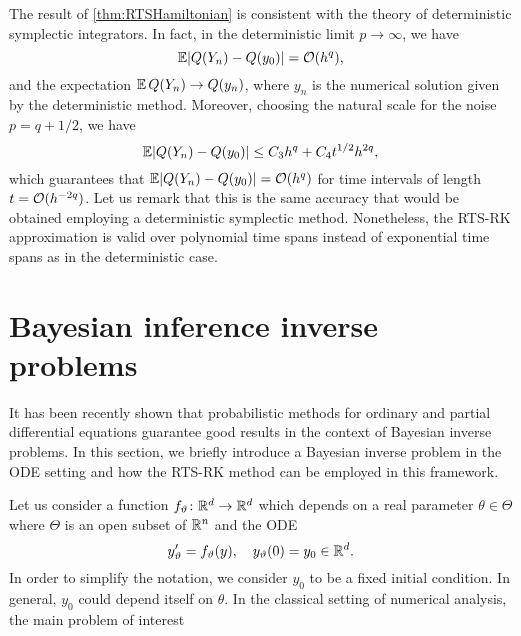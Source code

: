 \documentclass[final,onefignum,onetabnum]{siamonline171218}
\begin{document}
\begin{remark} The result of \cref{thm:RTSHamiltonian} is consistent with the theory of deterministic symplectic integrators. In fact, in the deterministic limit $p \to \infty$, we have
	\begin{equation}
	\operatorname{\mathbb{E}} \lvert Q(Y_n) - Q(y_0)\rvert = \mathcal{O}(h^q),
	\end{equation}
	and the expectation $\operatorname{\mathbb{E}} Q(Y_n) \to Q(y_n)$, where $y_n$ is the numerical solution given by the deterministic method. Moreover, choosing the natural scale for the noise $p = q + 1/2$, we have
	\begin{equation}\label{eq:OptimalNoiseScale}
	\E\abs{Q(Y_n) - Q(y_0)} \leq C_3 h^q + C_4t^{1/2}h^{2q},
	\end{equation} 
	which guarantees that $\operatorname{\mathbb{E}}\lvert Q(Y_n) - Q(y_0)\rvert = \mathcal{O}(h^q)$ for time intervals of length $t = \mathcal{O}(h^{-2q})$. Let us remark that this is the same accuracy that would be obtained employing a deterministic symplectic method. Nonetheless, the RTS-RK approximation is valid over polynomial time spans instead of exponential time spans as in the deterministic case.
\end{remark}


\section{Bayesian inference inverse problems}\label{sec:BayesianInference} It has been recently shown \cite{CGS16, CCC16} that probabilistic methods for ordinary and partial differential equations guarantee good results in the context of Bayesian inverse problems. In this section, we briefly introduce a Bayesian inverse problem in the ODE setting and how the RTS-RK method can be employed in this framework. 

Let us consider a function $f_\vartheta \colon \mathbb{R}^d \to \mathbb{R}^d$ which depends on a real parameter $\theta \in \Theta$ where $\Theta$ is an open subset of $\mathbb{R}^n$ and the ODE
\begin{equation}\label{eq:ODEParam}
	y_\theta' = f_\theta(y), \quad y_\theta(0) = y_0 \in \R^d.
\end{equation}
In order to simplify the notation, we consider $y_0$ to be a fixed initial condition. In general, $y_0$ could depend itself on $\theta$. In the classical setting of numerical analysis, the main problem of interest 
\end{document}
